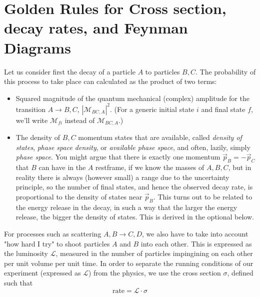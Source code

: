 \section{Golden Rules for Cross section, decay rates, and Feynman Diagrams}
\label{sec:GoldenRulesAndDensityOfStates}

Let us consider first the decay of a particle $A$ to particles $B, C$. The probability of this process to take place can calculated as the product of two terms:
\begin{itemize}
\item Squared magnitude of the quantum mechanical (complex) amplitude for the transition $A\to B, C$, $\left|\mathcal{M}_{BC,A}\right|^2$. (For a generic initial state $i$ and final state $f$, we'll write $\mathcal{M}_{fi}$ instead of $\mathcal{M}_{BC,A}$.)
\item The density of $B, C$ momentum states that are available, called \emph{density of states}, \emph{phase space density}, or \emph{available phase space}, and often, lazily, simply \emph{phase space}. 
You might argue that there is exactly one momentum $\vec{p}_B = -\vec{p}_C$ that $B$ can have in the $A$ restframe, if we know the masses of $A, B, C$, but in reality there is always (however small) a range due to the uncertainty principle, so the number of final states, and hence the observed decay rate, is proportional to the density of states near $\vec{p}_B$. This turns out to be related to the energy release in the decay, in such a way that the larger the energy release, the bigger the density of states. This is derived in the optional  below.
\end{itemize}

For processes such as scattering $A, B \to C, D$, we also have to take into account "how hard I try" to shoot particles $A$ and $B$ into each other. This is expressed as the luminosity $\mathcal{L}$, measured in the number of particles impingining on each other per unit volume per unit time. In order to separate the running conditions of our experiment (expressed as $\mathcal{L}$) from the physics, we use the cross section $\sigma$, defined such that 
\begin{equation}
\mathrm{rate} = \mathcal{L} \cdot \sigma
\end{equation}

